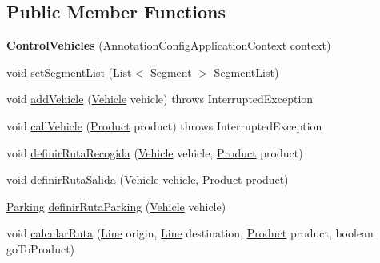 \subsection*{Public Member Functions}
\begin{DoxyCompactItemize}
\item 
\mbox{\label{classmondragon_1_1edu_1_1control_1_1_control_vehicles_a9dc36b79310c15ee3628e314a8201c6f}} 
{\bfseries Control\+Vehicles} (Annotation\+Config\+Application\+Context context)
\item 
void \mbox{\hyperlink{classmondragon_1_1edu_1_1control_1_1_control_vehicles_a3752f0ee665a4212470882d084bfaa67}{set\+Segment\+List}} (List$<$ \mbox{\hyperlink{classmondragon_1_1edu_1_1clases_1_1_segment}{Segment}} $>$ Segment\+List)
\item 
void \mbox{\hyperlink{classmondragon_1_1edu_1_1control_1_1_control_vehicles_afd9646551c40268a5fcf20153df94da5}{add\+Vehicle}} (\mbox{\hyperlink{classmondragon_1_1edu_1_1clases_1_1_vehicle}{Vehicle}} vehicle)  throws Interrupted\+Exception 
\item 
void \mbox{\hyperlink{classmondragon_1_1edu_1_1control_1_1_control_vehicles_ab9a26a6fd5a585bd9468a9476feaf1cf}{call\+Vehicle}} (\mbox{\hyperlink{classmondragon_1_1edu_1_1clases_1_1_product}{Product}} product)  throws Interrupted\+Exception
\item 
void \mbox{\hyperlink{classmondragon_1_1edu_1_1control_1_1_control_vehicles_ac45999cf276055a6695eaf35cf781775}{definir\+Ruta\+Recogida}} (\mbox{\hyperlink{classmondragon_1_1edu_1_1clases_1_1_vehicle}{Vehicle}} vehicle, \mbox{\hyperlink{classmondragon_1_1edu_1_1clases_1_1_product}{Product}} product)
\item 
void \mbox{\hyperlink{classmondragon_1_1edu_1_1control_1_1_control_vehicles_affe370c8235e69844a66697e87f2bb37}{definir\+Ruta\+Salida}} (\mbox{\hyperlink{classmondragon_1_1edu_1_1clases_1_1_vehicle}{Vehicle}} vehicle, \mbox{\hyperlink{classmondragon_1_1edu_1_1clases_1_1_product}{Product}} product)
\item 
\mbox{\hyperlink{classmondragon_1_1edu_1_1clases_1_1_parking}{Parking}} \mbox{\hyperlink{classmondragon_1_1edu_1_1control_1_1_control_vehicles_a4ea8338d43962d68e7c29bad88cfbcf3}{definir\+Ruta\+Parking}} (\mbox{\hyperlink{classmondragon_1_1edu_1_1clases_1_1_vehicle}{Vehicle}} vehicle)
\item 
void \mbox{\hyperlink{classmondragon_1_1edu_1_1control_1_1_control_vehicles_a12c621e7167cf4747f97a1689ab39ef1}{calcular\+Ruta}} (\mbox{\hyperlink{classmondragon_1_1edu_1_1clases_1_1_line}{Line}} origin, \mbox{\hyperlink{classmondragon_1_1edu_1_1clases_1_1_line}{Line}} destination, \mbox{\hyperlink{classmondragon_1_1edu_1_1clases_1_1_product}{Product}} product, boolean go\+To\+Product)

\end{DoxyCompactItemize}
